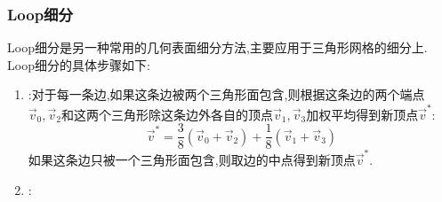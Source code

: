 \documentclass{ctexart}
\begin{document}
\subsubsection{Loop细分}
Loop细分是另一种常用的几何表面细分方法,主要应用于三角形网格的细分上. Loop细分的具体步骤如下:
\begin{enumerate}[label=\tbf{\arabic*}.,topsep=0pt,parsep=0pt,itemsep=0pt,partopsep=0pt]
    \item {}:对于每一条边,如果这条边被两个三角形面包含,则根据这条边的两个端点$\vec{v}_0,\vec{v}_2$和这两个三角形除这条边外各自的顶点$\vec{v}_1,\vec{v}_3$加权平均得到新顶点$\vec{v}^\ast$:
        \[\vec{v}^\ast=\dfrac{3}{8}\left(\vec{v}_0+\vec{v}_2\right)+\dfrac{1}{8}\left(\vec{v}_1+\vec{v}_3\right)\]
    如果这条边只被一个三角形面包含,则取边的中点得到新顶点$\vec{v}^\ast$.
    \item {}:
\end{enumerate}
\end{document}
